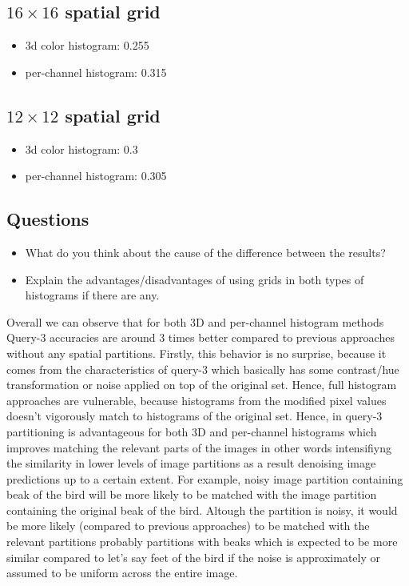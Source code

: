 \documentclass[12pt]{article}
\begin{document}
\subsection{$16\times16$ spatial grid}
\begin{itemize}
\item 3d color histogram: 0.255
\item per-channel histogram: 0.315
\end{itemize}

\subsection{$12\times12$ spatial grid}
\begin{itemize}
\item 3d color histogram: 0.3
\item per-channel histogram: 0.305
\end{itemize}

\subsection{Questions}
\begin{itemize}
\item What do you think about the cause of the difference between the results?
\item Explain the advantages/disadvantages of using grids in both types of histograms if there are any.
\end{itemize}




Overall we can observe that for both 3D and per-channel histogram methods Query-3 accuracies are around 3 times better compared to previous approaches without any spatial partitions.
Firstly, this behavior is no surprise, because it comes from the characteristics of query-3 which basically has some 
contrast/hue transformation or noise applied on top of the original set. Hence, full histogram approaches are vulnerable, because
histograms from the modified pixel values doesn't vigorously match to histograms of the original set.
Hence, in query-3 partitioning is advantageous for both 3D and per-channel histograms which
improves matching the relevant parts of the images in other words intensifiyng the similarity in lower levels of 
image partitions as a result denoising image predictions up to a certain extent.
For example, noisy image partition containing beak of the bird will be more likely to be matched with the
image partition containing the original beak of the bird. Altough the partition is noisy, 
it would be more likely (compared to previous approaches) to be matched with the relevant
partitions probably partitions with beaks which is expected to be more similar compared to let's say
feet of the bird if the noise is approximately or assumed to be uniform across the entire image.
\end{document}
